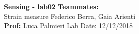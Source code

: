 \noindent
\large\textbf{Sensing - lab02} \hfill \textbf{Teammates:} \\
\normalsize Strain measure \hfill  Federico Berra, Gaia Arienti\\
\textbf{Prof:} Luca Palmieri \hfill Lab Date: 12/12/2018
